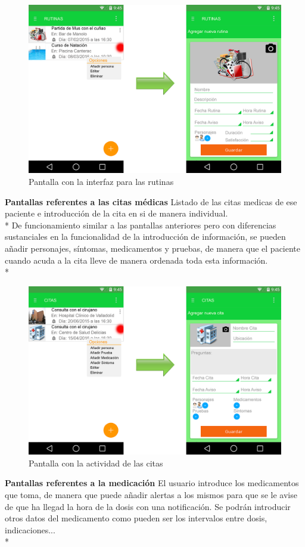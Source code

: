 \documentclass[../pfc.tex]{subfiles}
\begin{document}
			
			\begin{figure}[h]
				\centering
				\includegraphics[width=0.7\linewidth]{../images/rutina}
				\caption{Pantalla con la interfaz para las rutinas}
				\label{fig:rutina}
			\end{figure}
						
			
			\textbf{Pantallas referentes a las citas médicas}
			Listado de las citas medicas de ese paciente e introducción de la cita en si de manera individual.\\*
			De funcionamiento similar a las pantallas anteriores pero con diferencias sustanciales en la funcionalidad de la introducción de información, se pueden añadir personajes, síntomas, medicamentos y pruebas, de manera que el paciente cuando acuda a la cita lleve de manera ordenada toda esta información.\\*
			
			\begin{figure}[h]
				\centering
				\includegraphics[width=0.7\linewidth]{../images/citas}
				\caption{Pantalla con la actividad de las citas}
				\label{fig:citas}
			\end{figure}
			
			
			\textbf{Pantallas referentes a la medicación}
			El usuario introduce los medicamentos que toma, de manera que puede añadir alertas a los mismos para que se le avise de que ha llegad la hora de la dosis con una notificación.
			Se podrán introducir otros datos del medicamento como pueden ser los intervalos entre dosis, indicaciones...\\*
			
\end{document}
